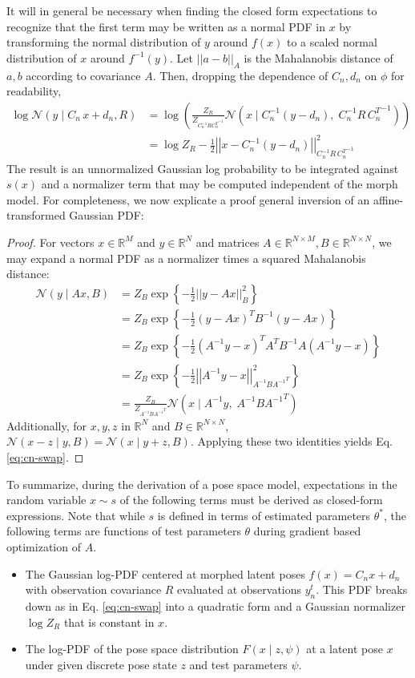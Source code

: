 \documentclass{article}         %
\newcommand{\inv}{^{-1}}
\newcommand{\RR}{\mathbb{R}}
\newcommand{\NN}{\mathcal{N}}
\newcommand{\norm}[1]{\left|\left| #1 \right|\right|}
\newcommand{\cb}[1]{\left\{ #1 \right\}}
\newcommand{\pn}[1]{\left( #1 \right)}
\begin{document}
It will in general be necessary when finding the closed form expectations to recognize that the first term may be written as a normal PDF in $x$ by transforming the normal distribution of $y$ around $f(x)$ to a scaled normal distribution of $x$ around $f\inv(y)$. Let $\norm{a - b}_A$ is the Mahalanobis distance of $a, b$ according to covariance $A$. Then, dropping the dependence of $C_n, d_n$ on $\phi$ for readability,
\begin{align}
    \log \NN(y\mid C_n\, x + d_n, R) &= \log\pn{\frac{Z_{R}}{Z_{C_n\inv R {C_n^T}\inv}} \NN\pn{x\mid C_n\inv \pn{y - d_n},\; C_n\inv R\, {C_n^T}\inv}} \\ &= \log Z_{R} - \frac{1}{2}\norm{x - C_n\inv (y - d_n)}^2_{C_n\inv R\, {C_n^T}\inv}
    \label{eq:cn-swap}
\end{align}
The result is an unnormalized Gaussian log probability to be integrated against $s(x)$ and a normalizer term that may be computed independent of the morph model. For completeness, we now explicate a proof general inversion of an affine-transformed Gaussian PDF:
\begin{proof} For vectors $x\in \RR^M$ and $y\in \RR^N$ and matrices $A\in \RR^{N\times M}, B\in \RR^{N\times N}$, we may expand a normal PDF as a normalizer times a squared Mahalanobis distance:
    \begin{align}
        \NN(y\mid Ax, B) &= Z_{B} \exp\cb{-\frac{1}{2}\norm{y - Ax}^2_{B}} \\
        &= Z_{B} \exp\cb{-\frac{1}{2}(y - Ax)^TB\inv(y - Ax)} \\
        &= Z_{B} \exp\cb{-\frac{1}{2}(A\inv y - x)^TA^TB\inv A(A\inv y - x)} \\
        &= Z_{B} \exp\cb{-\frac{1}{2}\norm{A\inv y - x}^2_{A\inv B{A\inv}^T}} \\
        &= \frac{Z_{B}}{Z_{A\inv B{A\inv}^T}} \NN\pn{x\mid A\inv y, \; A\inv B{A\inv}^T}
    \end{align}
Additionally, for $x,y,z$ in $\RR^N$ and $B\in\RR^{N\times N}$, $\NN(x - z \mid y, B) = \NN(x \mid y+z, B)$. Applying these two identities yields Eq. \ref{eq:cn-swap}.
\end{proof}

To summarize, during the derivation of a pose space model, expectations in the random variable $x\sim s$ of the following terms must be derived as closed-form expressions. Note that while $s$ is defined in terms of estimated parameters $\theta^*$, the following terms are functions of test parameters $\theta$ during gradient based optimization of $A$.
\begin{itemize}
    \item The Gaussian log-PDF centered at morphed latent poses $f(x) = C_n x + d_n$ with observation covariance $R$ evaluated at observations $y_n^t$. This PDF breaks down as in Eq. \ref{eq:cn-swap} into a quadratic form and a Gaussian normalizer $\log Z_R$ that is constant in $x$.
    \item The log-PDF of the pose space distribution $F(x\mid z, \psi)$ at a latent pose $x$ under given discrete pose state $z$ and test parameters $\psi$.
\end{itemize}
\end{document}

